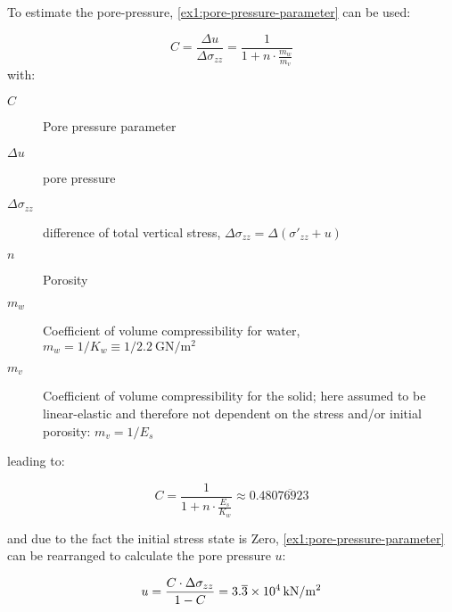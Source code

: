\vspace{1em}

To estimate the pore-pressure, \autoref{ex1:pore-pressure-parameter} can be used:

\begin{equation}
    \label{ex1:pore-pressure-parameter}
    C = \frac{\Delta u}{\Delta \sigma_{zz}} = \frac{1}{1 + n \cdot \frac{m_w}{m_v}}
\end{equation}
with:
\begin{description}
    \item[$C$] Pore pressure parameter
    \item[$\Delta u$] pore pressure
    \item[$\Delta \sigma_{zz}$] difference of total vertical stress, $\Delta \sigma_{zz} = \Delta (\sigma'_{zz} + u)$
    \item[$n$] Porosity
    \item[$m_w$] Coefficient of volume compressibility for water, $m_w = 1/K_w \equiv 1/{\SI[per-mode = symbol]{2.2}{\giga\newton\per\square\metre}}$
    \item[$m_v$] Coefficient of volume compressibility for the solid; here assumed to be linear-elastic and therefore not dependent on the stress and/or initial porosity: $m_v = 1 / E_s$
\end{description}

\vspace{1em}

leading to:

\begin{equation}
    C = \frac{1}{1 + n \cdot \frac{E_s}{K_w}} \approx 0.48\overline{076923}
\end{equation}

and due to the fact the initial stress state is Zero,
\autoref{ex1:pore-pressure-parameter} can be rearranged to calculate the pore
pressure $u$:

\begin{equation}
    u = \frac{C \cdot \Delta \sigma_{zz}}{1 - C} = 3.\overline{3}\times\SI{E4}{\si[per-mode = symbol]{\kilo\newton\per\square\metre}}
\end{equation}



